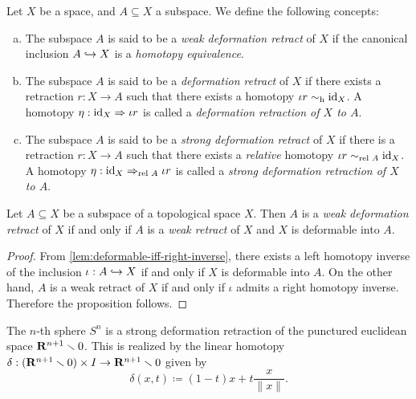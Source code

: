 \begin{definition}
\label{def:deformation-retract}
Let \(X\) be a space, and \(A \subseteq X\) a subspace. We define the following
concepts:
\begin{enumerate}[(a)]\setlength\itemsep{0em}
\item The subspace \(A\) is said to be a \emph{weak deformation
    retract} of \(X\) if the canonical inclusion \(A \hookrightarrow X\) is a
  \emph{homotopy equivalence}.

\item The subspace \(A\) is said to be a \emph{deformation retract} of \(X\) if
  there exists a retraction \(r: X \to A\) such that there exists a homotopy
  \(\iota r \sim_{\text{h}} \operatorname{id}_X\). A homotopy \(\eta: \operatorname{id}_X \Rightarrow \iota r\) is called a
  \emph{deformation retraction of \(X\) to \(A\)}.

\item The subspace \(A\) is said to be a \emph{strong deformation retract} of
  \(X\) if there is a retraction \(r: X \to A\) such that there exists a
  \emph{relative} homotopy \(\iota r \sim_{\text{rel }{A}} \operatorname{id}_X\). A homotopy
  \(\eta: \operatorname{id}_X \Rightarrow_{\text{rel }{A}} \iota r\) is called a \emph{strong deformation
    retraction of \(X\) to \(A\)}.
\end{enumerate}
\end{definition}

\begin{lemma}
\label{lem:weak-deformation-retract-iff-weak-retract-and-deformable}
Let \(A \subseteq X\) be a subspace of a topological space \(X\). Then \(A\) is
a \emph{weak deformation retract} of \(X\) if and only if \(A\) is a \emph{weak
  retract} of \(X\) and \(X\) is deformable into \(A\).
\end{lemma}

\begin{proof}
From \cref{lem:deformable-iff-right-inverse}, there exists a left homotopy
inverse of the inclusion \(\iota: A \hookrightarrow X\) if and only if \(X\) is deformable
into \(A\). On the other hand, \(A\) is a weak retract of \(X\) if and only if
\(\iota\) admits a right homotopy inverse. Therefore the proposition follows.
\end{proof}

\begin{example}
\label{exp:Sn-is-strong-deformation-retract}
The \(n\)-th sphere \(S^n\) is a strong deformation retraction of the punctured
euclidean space \(\mathbf{R}^{n+1} \smallsetminus 0\). This is realized by the linear
homotopy \(\delta: (\mathbf{R}^{n+1} \smallsetminus 0) \times I \to \mathbf{R}^{n+1} \smallsetminus 0\)
given by
\[
\delta(x, t) \coloneq (1 - t) x + t \frac{x}{\| x \|}.
\]
\end{example}

